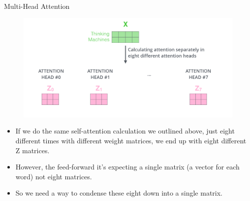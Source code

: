 \documentclass[handout]{beamer}
\begin{document}
\begin{frame}{Multi-Head Attention}

     \begin{figure}[h]
        	\includegraphics[scale = 0.25]{pics/transformer_attention_heads_z.png}
        \end{figure}


\begin{scriptsize}
\begin{itemize}
 \item If we do the same self-attention calculation we outlined above, just eight different times with different weight matrices, we end up with eight different Z matrices.
 \item However, the feed-forward it's expecting a single matrix (a vector for each word)  not eight matrices.
 \item So we need a way to condense these eight down into a single matrix.
\end{itemize}

\end{scriptsize}

\end{frame}
\end{document}

